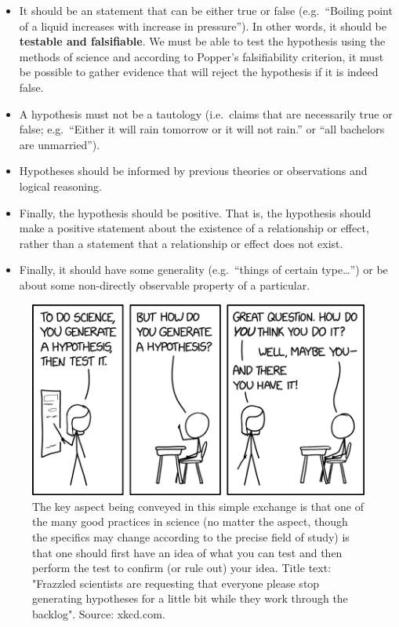 \documentclass[
]{book}
\begin{document}
\begin{itemize}
\item
  It should be an statement that can be either true or false (e.g.~``Boiling point of a liquid increases with increase in pressure''). In other words, it should be \textbf{testable and falsifiable}. We must be able to test the hypothesis using the methods of science and according to Popper's falsifiability criterion, it must be possible to gather evidence that will reject the hypothesis if it is indeed false.
\item
  A hypothesis must not be a tautology (i.e.~claims that are necessarily true or false; e.g.~``Either it will rain tomorrow or it will not rain.'' or ``all bachelors are unmarried'').
\item
  Hypotheses should be informed by previous theories or observations and logical reasoning.
\item
  Finally, the hypothesis should be positive. That is, the hypothesis should make a positive statement about the existence of a relationship or effect, rather than a statement that a relationship or effect does not exist.
\item
  Finally, it should have some generality (e.g.~``things of certain type\ldots{}'') or be about some non-directly observable property of a particular.
\end{itemize}

\begin{figure}

{\centering \includegraphics[width=0.66\linewidth]{Figures/hypothesis_generation} 

}

\caption{The key aspect being conveyed in this simple exchange is that one of the many good practices in science (no matter the aspect, though the specifics may change according to the precise field of study) is that one should first have an idea of what you can test and then perform the test to confirm (or rule out) your idea. Title text: "Frazzled scientists are requesting that everyone please stop generating hypotheses for a little bit while they work through the backlog". Source: xkcd.com.}\label{fig:xkcd-hypothesis}
\end{figure}
\end{document}
